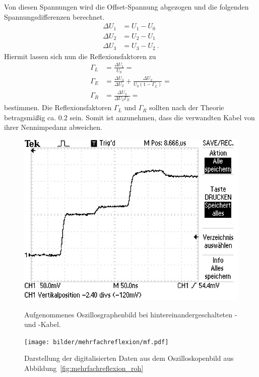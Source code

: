 Von diesen Spannungen wird die Offset-Spannung abgezogen und die folgenden
Spannungsdifferenzen berechnet.
\begin{align*}
  \Delta U_1 &= U_1 - U_0 \\
  \Delta U_2 &= U_2 - U_1 \\
  \Delta U_3 &= U_3 - U_2~.
\end{align*}
Hiermit lassen sich nun die Reflexionsfaktoren zu
\begin{align*}
  \Gamma_L &= \frac{\Delta U_1}{U_0} =  \\
  \Gamma_E &= \frac{\Delta U_3}{\Delta U_2} +
  \frac{\Delta U_2}{U_0(1 - \Gamma_L)}
  =  \\
  \Gamma_R &= \frac{\Delta U_3}{\Delta U_2 \Gamma_E}
  = 
\end{align*}
bestimmen.
Die Reflexionsfaktoren $\Gamma_L$ und $\Gamma_R$ sollten nach der Theorie
betragsmäßig ca. 0.2 sein. Somit ist anzunehmen, dass die verwandten Kabel von
ihrer Nennimpedanz abweichen.

\begin{figure}[htpb]
  \centering
  \includegraphics[scale=0.6]{bilder/mehrfachreflexion/F0000TEK.JPG}
  \caption{Aufgenommenes Oszillosgraphenbild bei hintereinandergeschalteten
    \CU- und \BU-Kabel.}
\label{fig:mehrfachreflexion_roh}
  \texttt{[image: bilder/mehrfachreflexion/mf.pdf]}
  \caption{Darstellung der digitalisierten Daten aus dem
    Oszilloskopenbild aus Abbildung~\ref{fig:mehrfachreflexion_roh}}
\label{fig:mehrfachreflexion}
\end{figure}

